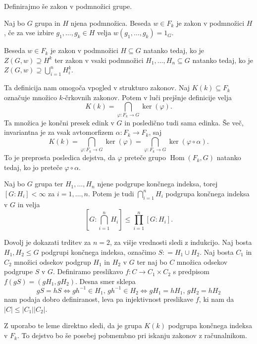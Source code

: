 \documentclass[mat1, tisk]{fmfdelo}
\numberwithin{equation}{section}  %
\begin{document}
Definirajmo še zakon v podmnožici grupe.
\begin{definicija}
    \label{def_zakon_v_podmnožici}
    Naj bo $G$ grupa in $H$ njena podmnožica. Beseda $w \in F_k$ je zakon v podmnožici $H$, če za vse izbire $g_1, \ldots, g_k \in H$ velja $w(g_1, \ldots, g_{k}) = 1_G$.
    \end{definicija}
    
    \begin{opomba}
    Beseda $w \in F_k$ je zakon v podmnožici $H \subseteq G$ natanko tedaj, ko je $Z(G, w) \supseteq H^{k}$ ter zakon v vsaki podmnožici $H_1, \ldots, H_n \subseteq G$ natanko tedaj, ko je $Z(G, w) \supseteq \bigcup_{i = 1}^{n} H_i^{k}$.  
    \end{opomba}

Ta definicija nam omogoča vpogled v strukturo zakonov. Naj $K(k) \subseteq F_k$ označuje množico $k$-črkovnih zakonov. Potem v luči prejšnje definicije velja
\begin{equation*}
K(k)  = \bigcap_{\varphi: F_k \to G} \ker(\varphi).   
\end{equation*}  
Ta množica je končni presek edink v $G$ in posledično tudi sama edinka. Še več, invariantna je za vsak avtomorfizem $\alpha: F_k \to  F_k$, saj
\begin{equation*}
    K(k)  = \bigcap_{\varphi: F_k \to G} \ker(\varphi) = \bigcap_{\varphi: F_k \to G} \ker(\varphi \circ \alpha). 
\end{equation*}  
To je preprosta posledica dejstva, da $\varphi$ preteče grupo $\operatorname{Hom}(F_k, G)$ natanko tedaj, ko jo preteče $\varphi \circ \alpha$.     

\begin{lema}\label{lem_koncni_indeks_koncnega_preseka}
Naj bo $G$ grupa ter $H_1, \ldots, H_n$ njene podgrupe končnega indeksa, torej $[G: H_i] < \infty$ za $i = 1, \ldots, n$. Potem je tudi $\bigcap_{i = 1}^{n} H_i$ podgrupa končnega indeksa v $G$ in velja
\begin{equation*}
\left[ G: \bigcap_{i = 1}^{n} H_i \right]  \le \prod_{i=1}^{n} [G: H_i].  
\end{equation*} 
\end{lema}

\begin{dokaz}
Dovolj je dokazati trditev za $n = 2$, za višje vrednosti sledi z indukcijo. Naj bosta $H_1, H_2 \le G$ podgrupi končnega indeksa, označimo $S: = H_1 \cup H_2$. Naj bosta $C_1$ in $C_2$ množici odsekov podgrup $H_1$ in $H_2$ v $G$ ter naj bo $C$ množica odsekov podgrupe $S$ v $G$. Definiramo preslikavo $f : C \to  C_1 \times C_2$ s predpisom $f(g S ) = (g H_1, g H_2)$. Desna smer sklepa \begin{equation*}
 g S = h S \iff gh^{-1} \in H_1, \, gh^{-1} \in H_2  \iff g H_1 = h H_1, \, g H_2 = h H_2
\end{equation*}  
nam podaja dobro definiranost, leva pa injektivnost preslikave $f$, ki nam da $\lvert C \rvert \le  \lvert C_1 \rvert \lvert C_2 \rvert $.    
\end{dokaz}
Z uporabo te leme direktno sledi, da je grupa $K(k)$ podgrupa končnega indeksa v $F_k$. To dejstvo bo še posebej pobmembno pri iskanju zakonov z računalnikom.
\end{document}
